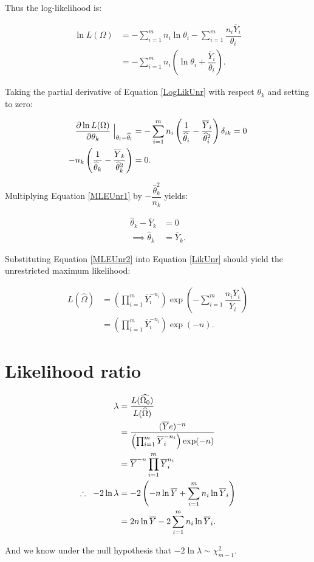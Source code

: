 \documentclass[12pt,a4paper]{article}
\newcommand{\eqn}[1]{Equation \ref{#1}}
\newcommand{\ovY}{\overline{Y}}
\newcommand{\wth}{\widehat{\theta}}
\begin{document}
    Thus the log-likelihood is:

    \begin{align}
        \ln{L(\Omega)} &= -\sum_{i=1}^m n_i \ln{\theta_i} - \sum_{i=1}^m \dfrac{n_i\ovY_i}{\theta_i} \\
        &= -\sum_{i=1}^m n_i\left(\ln{\theta_i} + \dfrac{\ovY_i}{\theta_i}\right). \label{LogLikUnr}
    \end{align}

    Taking the partial derivative of \eqn{LogLikUnr} with respect $\theta_k$ and setting to zero:

    \begin{align}
        \dfrac{\partial \ln{L(\Omega)}}{\partial \theta_k} \Bigm\lvert_{\theta_l = \wth_l} &= -\sum_{i=1}^m n_i\left(\dfrac{1}{\wth_i} - \dfrac{\ovY_i}{\wth_i^2}\right) \delta_{ik} = 0 \nonumber\\
        -n_k\left(\dfrac{1}{\wth_k}-\dfrac{\ovY_k}{\wth_k^2}\right) &= 0. \label{MLEUnr1}
    \end{align}

    Multiplying \eqn{MLEUnr1} by $-\dfrac{\wth_k^2}{n_k}$ yields:

    \begin{align}
        \wth_k - \ovY_k &= 0 \nonumber\\
        \implies \wth_k &= \ovY_k. \label{MLEUnr2}
    \end{align}

    Substituting \eqn{MLEUnr2} into \eqn{LikUnr} should yield the unrestricted maximum likelihood:

    \begin{align}
        L(\widehat{\Omega}) &= \left(\prod_{i=1}^m \ovY_i^{-n_i}\right) \exp\left(-\sum_{i=1}^m \dfrac{n_i\ovY_i}{\ovY_i}\right) \nonumber \\
        &= \left(\prod_{i=1}^m \ovY_i^{-n_i}\right)\exp(-n). \label{MLUnr}
    \end{align}

    \section{Likelihood ratio}
    \begin{align}
        \lambda &= \dfrac{L(\widehat{\Omega_0})}{L(\widehat{\Omega})} \nonumber \\
        &= \dfrac{(\ovY e)^{-n}}{\left(\prod_{i=1}^m \ovY_i^{-n_i}\right)\exp(-n)} \nonumber\\
        &= \ovY^{-n} \prod_{i=1}^m \ovY_i^{n_i} \nonumber \\
        \therefore \hspace{0.2cm} -2\ln{\lambda} &= -2 \left(-n\ln{\ovY} + \sum_{i=1}^m n_i \ln{\ovY_i}\right) \nonumber\\
        &= 2n\ln{\ovY} - 2\sum_{i=1}^{m} n_i \ln{\ovY_i}. \label{testSt} 
    \end{align}

    And we know under the null hypothesis that $-2\ln{\lambda} \sim \chi^2_{m-1}$. 
\end{document}
